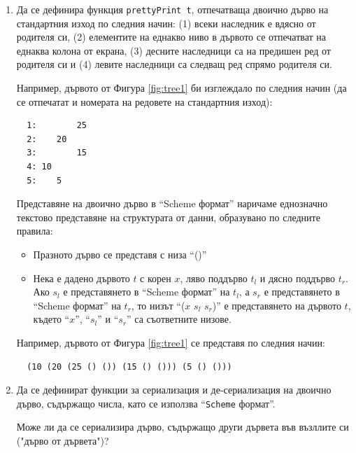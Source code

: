 \begin{enumerate}[resume]

  \item Да се дефинира функция \texttt{prettyPrint t}, отпечатваща двоично дърво на стандартния изход по следния начин: (1) всеки наследник е вдясно от родителя си, (2) елементите на еднакво ниво в дървото се отпечатват на еднаква колона от екрана, (3) десните наследници са на предишен ред от родителя си и (4) левите наследници са следващ ред спрямо родителя си.

  Например, дървото от Фигура \ref{fig:tree1} би изглеждало по следния начин (да се отпечатат и номерата на редовете на стандартния изход):

  \begin{verbatim}
  1:        25
  2:    20
  3:        15
  4: 10
  5:    5
  \end{verbatim}

\begin{mdframed}[hidealllines=true,backgroundcolor=gray!20]
  Представяне на двоично дърво в ``Scheme формат'' наричаме еднозначно текстово представяне на структурата от данни, образувано по следните правила:
  \begin{itemize}
    \item Празното дърво се представя с низа ``()''
    \item Нека е дадено дървото $t$ с корен $x$, ляво поддърво $t_l$ и дясно поддърво $t_r$. Ако $s_l$ е представянето в ``Scheme формат'' на $t_l$, а $s_r$ е представянето в ``Scheme формат'' на $t_r$, то низът ``($x$ $s_l$ $s_r$)'' е представянето на дървото $t$, където ``$x$'', ``$s_l$'' и ``$s_r$'' са съответните низове.
  
  \end{itemize}
  Например, дървото от Фигура \ref{fig:tree1} се представя по следния начин:
  
  \begin{verbatim}
  (10 (20 (25 () ()) (15 () ())) (5 () ()))
  \end{verbatim}
  
  \end{mdframed}

  \item Да се дефинират функции за сериализация и де-сериализация на двоично дърво, съдържащо числа, като се използва ``\texttt{Scheme} формат''.
  
   Може ли да се сериализира дърво, съдържащо други дървета във възллите си ("дърво от дървета")?

\end{enumerate}

